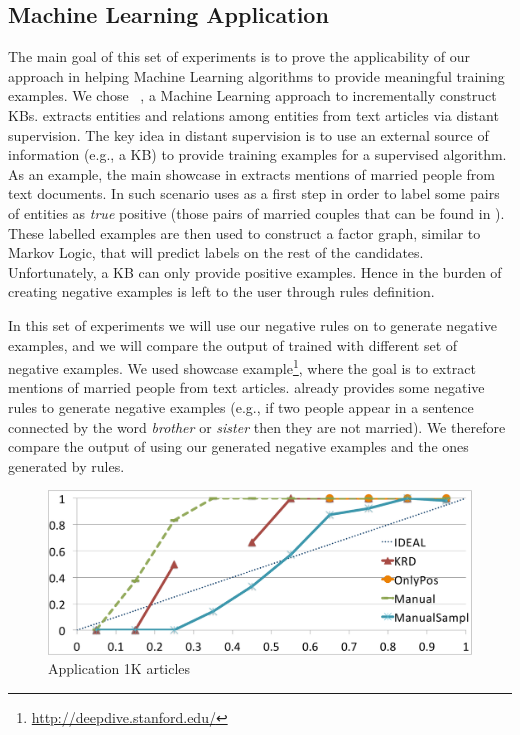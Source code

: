 \subsection{Machine Learning Application}
The main goal of this set of experiments is to prove the applicability of our approach in helping Machine Learning algorithms to provide meaningful training examples.
We chose \deepdive~\cite{shin2015incremental}, a Machine Learning approach to incrementally construct KBs. \deepdive extracts entities and relations among entities from text articles via distant supervision. The key idea in distant supervision is to use an external source of information (e.g., a KB) to provide training examples for a supervised algorithm. As an example, the main showcase in \deepdive extracts mentions of married people from text documents. In such scenario \deepdive uses as a first step \dbpedia in order to label some pairs of entities as \emph{true} positive (those pairs of married couples that can be found in \dbpedia). These labelled examples are then used to construct a factor graph, similar to Markov Logic, that will predict labels on the rest of the candidates. Unfortunately, a KB can only provide positive examples. Hence in \deepdive the burden of creating negative examples is left to the user through rules definition. 

In this set of experiments we will use our negative rules on \dbpedia to generate negative examples, and we will compare the output of \deepdive trained with different set of negative examples. We used \deepdive showcase example\footnote{\url{http://deepdive.stanford.edu/}}, where the goal is to extract mentions of married people from text articles. \deepdive already provides some negative rules to generate negative examples (e.g., if two people appear in a sentence connected by the word \textit{brother} or \textit{sister} then they are not married). We therefore compare the output of \deepdive using our generated negative examples and the ones generated by \deepdive rules.

\begin{figure}[t]
	\centering
	\includegraphics[width=\columnwidth]{include/figure/deepDive1K.pdf}
	\caption{\deepdive Application 1K articles}
	\label{fig:deep_dive_1k}
\end{figure}

